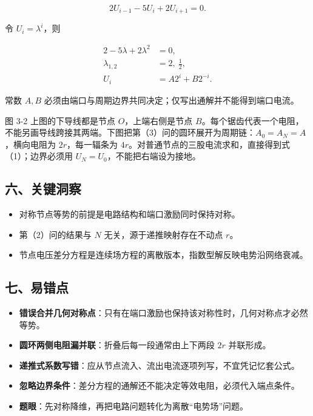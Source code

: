 \documentclass[12pt,a4paper,UTF8]{ctexart}
\newcommand{\tightlist}{\setlength{\itemsep}{0pt}\setlength{\parskip}{0pt}}
\begin{document}
\[2U_{i-1}-5U_i+2U_{i+1}=0.\]

令 \(U_i=\lambda^i\)，则

\[\begin{aligned}
2-5\lambda+2\lambda^2&=0,\\
\lambda_{1,2}&=2,\ \frac12,\\
U_i&=A2^i+B2^{-i}.
\end{aligned}\]

常数 \(A,B\)
必须由端口与周期边界共同决定；仅写出通解并不能得到端口电流。

图 3-2 上图的下导线都是节点 \(O\)，上端右侧是节点
\(B\)。每个锯齿代表一个电阻，不能另画导线跨接其两端。下图把第（3）问的圆环展开为周期链：\(A_0=A_N=A\)，横向电阻为
\(2r\)，每一辐条为
\(4r\)。对普通节点的三股电流求和，直接得到式（1）；边界必须用
\(U_N=U_0\)，不能把右端设为接地。

\subsection{六、关键洞察}\label{ux516dux5173ux952eux6d1eux5bdf-2}

\begin{itemize}
\tightlist
\item
  对称节点等势的前提是电路结构和端口激励同时保持对称。
\item
  第（2）问的结果与 \(N\) 无关，源于递推映射存在不动点 \(r\)。
\item
  节点电压差分方程是连续场方程的离散版本，指数型解反映电势沿网络衰减。
\end{itemize}

\subsection{七、易错点}\label{ux4e03ux6613ux9519ux70b9-2}

\begin{itemize}
\tightlist
\item
  \textbf{错误合并几何对称点}：只有在端口激励也保持该对称性时，几何对称点才必然等势。
\item
  \textbf{圆环两侧电阻漏并联}：折叠后每一段通常由上下两段 \(2r\)
  并联形成。
\item
  \textbf{递推式系数写错}：应从节点流入、流出电流逐项列写，不宜凭记忆套公式。
\item
  \textbf{忽略边界条件}：差分方程的通解还不能决定等效电阻，必须代入端点条件。
\item
  \textbf{题眼}：先对称降维，再把电路问题转化为离散``电势场''问题。
\end{itemize}
\end{document}
